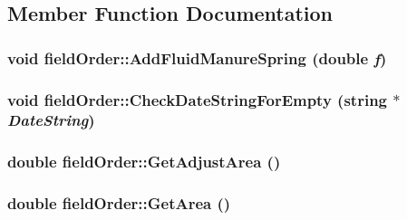 \subsection{Member Function Documentation}
\hypertarget{classfield_order_a8102a5fa37a4b0783732d6776ca0855f}{
\subsubsection[{AddFluidManureSpring}]{\setlength{\rightskip}{0pt plus 5cm}void fieldOrder::AddFluidManureSpring (double {\em f})}}
\label{classfield_order_a8102a5fa37a4b0783732d6776ca0855f}
\hypertarget{classfield_order_a2d96466ecd6bd5fec245340cc9a8e409}{
\subsubsection[{CheckDateStringForEmpty}]{\setlength{\rightskip}{0pt plus 5cm}void fieldOrder::CheckDateStringForEmpty (string $\ast$ {\em DateString})}}
\label{classfield_order_a2d96466ecd6bd5fec245340cc9a8e409}
\hypertarget{classfield_order_a566bf1457e49d94ef8db6d45826adbe6}{
\subsubsection[{GetAdjustArea}]{\setlength{\rightskip}{0pt plus 5cm}double fieldOrder::GetAdjustArea ()}}
\label{classfield_order_a566bf1457e49d94ef8db6d45826adbe6}
\hypertarget{classfield_order_a2d9be21e545b46ba9472f947a002c480}{
\subsubsection[{GetArea}]{\setlength{\rightskip}{0pt plus 5cm}double fieldOrder::GetArea ()}}
\label{classfield_order_a2d9be21e545b46ba9472f947a002c480}
